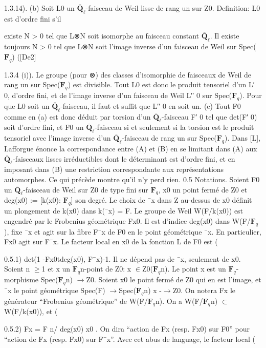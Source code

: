 \documentclass[11pt]{article}
\begin{document}
1.3.14). (b) Soit L0 un \(\overline{\mathbf Q}_\ell\)-faisceau de Weil lisse de rang un sur Z0. Definition: L0 est d’ordre fini s’il

existe N > 0 tel que L⊗N soit isomorphe au faisceau constant \(\overline{\mathbf Q}_\ell\). Il existe toujours N > 0 tel que L⊗N soit l’image inverse d’un faisceau de Weil sur Spec(\(\mathbf F_q\)) ([De2] 

1.3.4 (i)). Le groupe (pour ⊗) des classes d’isomorphie de faisceaux de Weil de rang un sur Spec(\(\mathbf F_q\)) est divisible. Tout L0 est donc le produit tensoriel d’un L′ 0, d’ordre fini, et de l’image inverse d’un faisceau de Weil L′′ 0 sur Spec(\(\mathbf F_q\)). Pour que L0 soit un \(\overline{\mathbf Q}_\ell\)-faisceau, il faut et suffit que L′′ 0 en soit un. (c) Tout F0 comme en (a) est donc déduit par torsion d’un \(\overline{\mathbf Q}_\ell\)-faisceau F′ 0 tel que det(F′ 0) soit d’ordre fini, et F0 un \(\overline{\mathbf Q}_\ell\)-faisceau si et seulement si la torsion est le produit tensoriel avec l’image inverse d’un \(\overline{\mathbf Q}_\ell\)-faisceau de rang un sur Spec(\(\mathbf F_q\)). Dans [L], Lafforgue énonce la correspondance entre (A) et (B) en se limitant dans (A) aux \(\overline{\mathbf Q}_\ell\)-faisceaux lisses irréductibles dont le déterminant est d’ordre fini, et en imposant dans (B) une restriction correspondante aux représentations automorphes. Ce qui précède montre qu’il n’y perd rien. 0.5 Notations. Soient F0 un \(\overline{\mathbf Q}_\ell\)-faisceau de Weil sur Z0 de type fini sur \(\mathbf F_q\), x0 un point fermé de Z0 et deg(x0) := [k(x0): \(\mathbf F_q\)] son degré. Le choix de ¯x dans Z au-dessus de x0 définit un plongement de k(x0) dans k(¯x) = F. Le groupe de Weil W(F/k(x0)) est engendré par le Frobenius géométrique Fx0. Il est d’indice deg(x0) dans W(F/\(\mathbf F_q\)), fixe ¯x et agit sur la fibre F¯x de F0 en le point géométrique ¯x. En particulier, Fx0 agit sur F¯x. Le facteur local en x0 de la fonction L de F0 est (

0.5.1) det(1 -Fx0tdeg(x0), F¯x)-1. Il ne dépend pas de ¯x, seulement de x0. Soient n \(\ge\)1 et x un \(\mathbf F_q\)n-point de Z0: x \(\in\)Z0(\(\mathbf F_q\)n). Le point x est un \(\mathbf F_q\)-morphisme Spec(\(\mathbf F_q\)n) \(\to\)Z0. Soient x0 le point fermé de Z0 qui en est l’image, et ¯x le point géométrique Spec(F) \(\to\)Spec(\(\mathbf F_q\)n) x -\(\to\)Z0. On notera Fx le générateur “Frobenius géométrique” de W(F/\(\mathbf F_q\)n). On a W(F/\(\mathbf F_q\)n) \(\subset\)W(F/k(x0)), et (

0.5.2) Fx = F n/ deg(x0) x0 . On dira “action de Fx (resp. Fx0) sur F0” pour “action de Fx (resp. Fx0) sur F¯x”. Avec cet abus de language, le facteur local (
\end{document}

